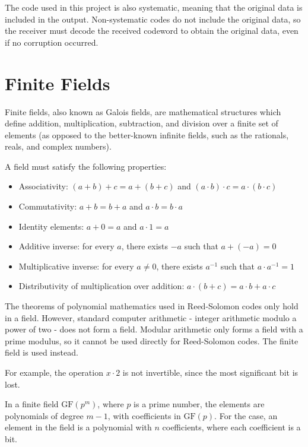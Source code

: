 The code used in this project is also systematic, meaning that the original data is included in the output.
Non-systematic codes do not include the original data, so the receiver must decode the received codeword to obtain the original data, even if no corruption occurred.

\section{Finite Fields}

Finite fields, also known as Galois fields, are mathematical structures which define addition, multiplication, subtraction, and division over a finite set of elements \cite{finite-fields-2nd-ed}
(as opposed to the better-known infinite fields, such as the rationals, reals, and complex numbers).

A field must satisfy the following properties:

\begin{itemize}[nosep]
    \item Associativity: $(a + b) + c = a + (b + c)$ and $(a \cdot b) \cdot c = a \cdot (b \cdot c)$
    \item Commutativity: $a + b = b + a$ and $a \cdot b = b \cdot a$
    \item Identity elements: $a + 0 = a$ and $a \cdot 1 = a$
    \item Additive inverse: for every $a$, there exists $-a$ such that $a + (-a) = 0$
    \item Multiplicative inverse: for every $a \neq 0$, there exists $a^{-1}$ such that $a \cdot a^{-1} = 1$
    \item Distributivity of multiplication over addition: $a \cdot (b + c) = a \cdot b + a \cdot c$
\end{itemize}

The theorems of polynomial mathematics used in Reed-Solomon codes only hold in a field. However, standard computer arithmetic - integer arithmetic modulo a power of two - does not form a field.
Modular arithmetic only forms a field with a prime modulus, so it cannot be used directly for Reed-Solomon codes. The finite field  is used instead.

For example, the operation $x \cdot 2$ is not invertible, since the most significant bit is lost.

In a finite field $\text{GF}(p^m)$, where $p$ is a prime number, the elements are polynomials of degree $m - 1$, with coefficients in $\text{GF}(p)$.
For the  case, an element in the field is a polynomial with $n$ coefficients, where each coefficient is a bit.

